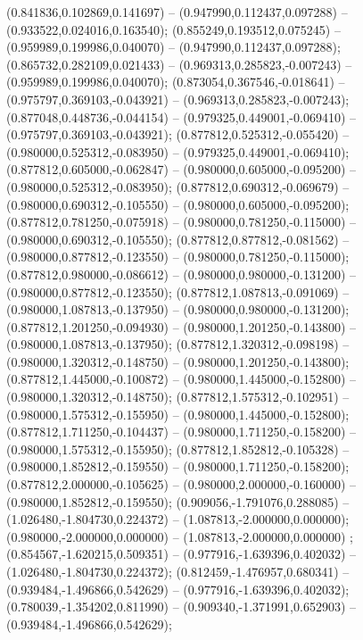  (0.841836,0.102869,0.141697) -- (0.947990,0.112437,0.097288) -- (0.933522,0.024016,0.163540);
 (0.855249,0.193512,0.075245) -- (0.959989,0.199986,0.040070) -- (0.947990,0.112437,0.097288);
 (0.865732,0.282109,0.021433) -- (0.969313,0.285823,-0.007243) -- (0.959989,0.199986,0.040070);
 (0.873054,0.367546,-0.018641) -- (0.975797,0.369103,-0.043921) -- (0.969313,0.285823,-0.007243);
 (0.877048,0.448736,-0.044154) -- (0.979325,0.449001,-0.069410) -- (0.975797,0.369103,-0.043921);
 (0.877812,0.525312,-0.055420) -- (0.980000,0.525312,-0.083950) -- (0.979325,0.449001,-0.069410);
 (0.877812,0.605000,-0.062847) -- (0.980000,0.605000,-0.095200) -- (0.980000,0.525312,-0.083950);
 (0.877812,0.690312,-0.069679) -- (0.980000,0.690312,-0.105550) -- (0.980000,0.605000,-0.095200);
 (0.877812,0.781250,-0.075918) -- (0.980000,0.781250,-0.115000) -- (0.980000,0.690312,-0.105550);
 (0.877812,0.877812,-0.081562) -- (0.980000,0.877812,-0.123550) -- (0.980000,0.781250,-0.115000);
 (0.877812,0.980000,-0.086612) -- (0.980000,0.980000,-0.131200) -- (0.980000,0.877812,-0.123550);
 (0.877812,1.087813,-0.091069) -- (0.980000,1.087813,-0.137950) -- (0.980000,0.980000,-0.131200);
 (0.877812,1.201250,-0.094930) -- (0.980000,1.201250,-0.143800) -- (0.980000,1.087813,-0.137950);
 (0.877812,1.320312,-0.098198) -- (0.980000,1.320312,-0.148750) -- (0.980000,1.201250,-0.143800);
 (0.877812,1.445000,-0.100872) -- (0.980000,1.445000,-0.152800) -- (0.980000,1.320312,-0.148750);
 (0.877812,1.575312,-0.102951) -- (0.980000,1.575312,-0.155950) -- (0.980000,1.445000,-0.152800);
 (0.877812,1.711250,-0.104437) -- (0.980000,1.711250,-0.158200) -- (0.980000,1.575312,-0.155950);
 (0.877812,1.852812,-0.105328) -- (0.980000,1.852812,-0.159550) -- (0.980000,1.711250,-0.158200);
 (0.877812,2.000000,-0.105625) -- (0.980000,2.000000,-0.160000) -- (0.980000,1.852812,-0.159550);
 (0.909056,-1.791076,0.288085) -- (1.026480,-1.804730,0.224372) -- (1.087813,-2.000000,0.000000);
 (0.980000,-2.000000,0.000000) -- (1.087813,-2.000000,0.000000) ;
 (0.854567,-1.620215,0.509351) -- (0.977916,-1.639396,0.402032) -- (1.026480,-1.804730,0.224372);
 (0.812459,-1.476957,0.680341) -- (0.939484,-1.496866,0.542629) -- (0.977916,-1.639396,0.402032);
 (0.780039,-1.354202,0.811990) -- (0.909340,-1.371991,0.652903) -- (0.939484,-1.496866,0.542629);
